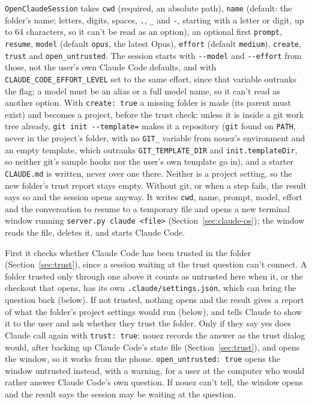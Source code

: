 \documentclass[10pt,a4paper]{article}
\newcommand{\code}[1]{\texttt{#1}}
\begin{document}
\code{OpenClaudeSession} takes \code{cwd} (required, an absolute path), \code{name} (default: the
folder's name; letters, digits, spaces, \code{.}, \code{\_} and \code{-}, starting with a letter or
digit, up to 64 characters, so it can't be read as an option), an optional first \code{prompt}, \code{resume}, \code{model} (default \code{opus}, the latest
Opus), \code{effort} (default \code{medium}), \code{create}, \code{trust} and
\code{open\_untrusted}. The session starts with \code{-{}-model} and \code{-{}-effort} from those, not
the user's own Claude Code defaults, and with \code{CLAUDE\_CODE\_EFFORT\_LEVEL} set to the same
effort, since that variable outranks the flag; a model must be an alias or a full model name, so it can't read
as another option. With
\code{create: true} a missing folder is made (its parent must exist) and becomes a project, before
the trust check: unless it is inside a git work tree already, \code{git init -{}-template=}
makes it a repository (\code{git} found on \code{PATH}, never in the project's folder, with no
\code{GIT\_} variable from nouez's environment and an empty template, which outranks
\code{GIT\_TEMPLATE\_DIR} and \code{init.templateDir}, so neither git's sample hooks nor the user's
own template go in), and a starter
\code{CLAUDE.md} is written, never over one there. Neither is a project setting, so the new
folder's trust report stays empty. Without git, or when a step fails, the result says so and the
session opens anyway. It writes \code{cwd}, name, prompt,
model, effort and the conversation to resume to a temporary file and opens a new terminal window running \code{server.py claude <file>}
(Section~\ref{sec:claude-os}); the window reads the file, deletes it, and starts Claude Code.

First it checks whether Claude Code has been trusted in the folder (Section~\ref{sec:trust}),
since a session waiting at the trust question can't connect. A folder trusted only through one
above it counts as untrusted here when it, or the checkout that opens, has its own
\code{.claude/settings.json}, which can bring the question back (below). If not trusted, nothing opens and the result
gives a report of what the folder's project settings would run (below), and tells Claude to show it
to the user and ask whether they trust the folder. Only if they say yes does Claude call
again with \code{trust: true}: nouez records the answer as the trust dialog would, after backing up
Claude Code's state file (Section~\ref{sec:trust}), and opens the window, so it works from the
phone. \code{open\_untrusted: true} opens the window untrusted instead, with a warning, for a user
at the computer who would rather answer Claude Code's own question. If nouez can't tell, the window
opens and the result says the session may be waiting at the question.
\end{document}
